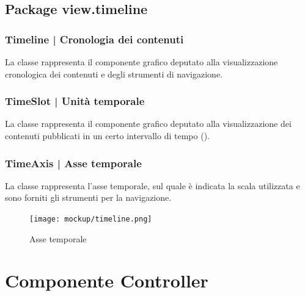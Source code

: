 \documentclass[10pt,a4paper,headinclude,footinclude,hidelinks]{scrreprt} %
\begin{document}
	\section{Package view.timeline}
	\label{sec:stage:design:view.timeline}

	\subsection[Timeline]{Timeline | Cronologia dei contenuti}
	\label{sec:stage:design:view.timeline:timeline-view}
	La classe \textit{} rappresenta il componente grafico deputato alla visualizzazione cronologica dei contenuti e degli strumenti di navigazione.

	\subsection[TimeSlot]{TimeSlot | Unità temporale}
	\label{sec:stage:design:view.timeline:time-slot}
	La classe \textit{} rappresenta il componente grafico deputato alla visualizzazione dei contenuti pubblicati in un certo intervallo di tempo (\textit{}).

	\subsection[TimeAxis]{TimeAxis | Asse temporale}
	\label{sec:stage:design:view.timeline:time-axis}
	La classe \textit{} rappresenta l'asse temporale, sul quale è indicata la scala utilizzata e sono forniti gli strumenti per la navigazione.

	\begin{figure}[ht]
		\begin{center}
	    	\texttt{[image: mockup/timeline.png]}
			\label{gfx:mockup:timeline:axis}
			\caption{Asse temporale}
		\end{center}
	\end{figure}

	\chapter{Componente Controller}
	\label{ch:stage:design:controller}
\end{document}

